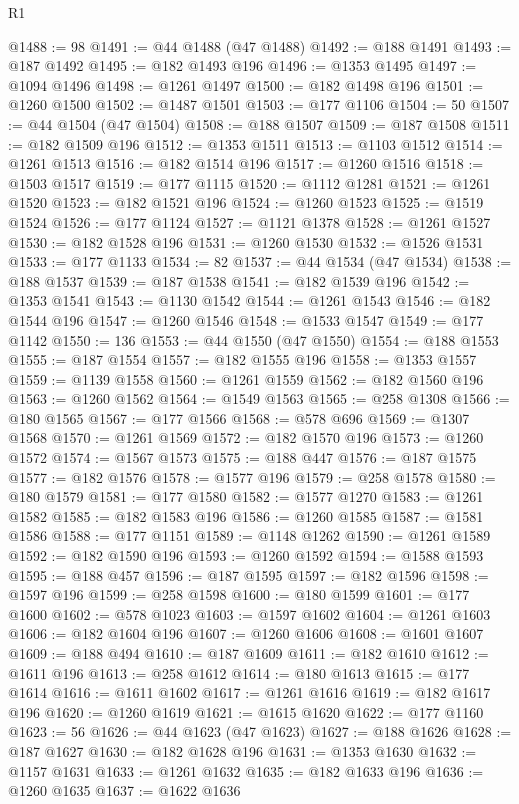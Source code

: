 \begin{lexlean}{R1}
\begin{coremodule}
@1488 := 98
@1491 := @44 @1488 (@47 @1488)
@1492 := @188 @1491
@1493 := @187 @1492
@1495 := @182 @1493 @196
@1496 := @1353 @1495
@1497 := @1094 @1496
@1498 := @1261 @1497
@1500 := @182 @1498 @196
@1501 := @1260 @1500
@1502 := @1487 @1501
@1503 := @177 @1106
@1504 := 50
@1507 := @44 @1504 (@47 @1504)
@1508 := @188 @1507
@1509 := @187 @1508
@1511 := @182 @1509 @196
@1512 := @1353 @1511
@1513 := @1103 @1512
@1514 := @1261 @1513
@1516 := @182 @1514 @196
@1517 := @1260 @1516
@1518 := @1503 @1517
@1519 := @177 @1115
@1520 := @1112 @1281
@1521 := @1261 @1520
@1523 := @182 @1521 @196
@1524 := @1260 @1523
@1525 := @1519 @1524
@1526 := @177 @1124
@1527 := @1121 @1378
@1528 := @1261 @1527
@1530 := @182 @1528 @196
@1531 := @1260 @1530
@1532 := @1526 @1531
@1533 := @177 @1133
@1534 := 82
@1537 := @44 @1534 (@47 @1534)
@1538 := @188 @1537
@1539 := @187 @1538
@1541 := @182 @1539 @196
@1542 := @1353 @1541
@1543 := @1130 @1542
@1544 := @1261 @1543
@1546 := @182 @1544 @196
@1547 := @1260 @1546
@1548 := @1533 @1547
@1549 := @177 @1142
@1550 := 136
@1553 := @44 @1550 (@47 @1550)
@1554 := @188 @1553
@1555 := @187 @1554
@1557 := @182 @1555 @196
@1558 := @1353 @1557
@1559 := @1139 @1558
@1560 := @1261 @1559
@1562 := @182 @1560 @196
@1563 := @1260 @1562
@1564 := @1549 @1563
@1565 := @258 @1308
@1566 := @180 @1565
@1567 := @177 @1566
@1568 := @578 @696
@1569 := @1307 @1568
@1570 := @1261 @1569
@1572 := @182 @1570 @196
@1573 := @1260 @1572
@1574 := @1567 @1573
@1575 := @188 @447
@1576 := @187 @1575
@1577 := @182 @1576
@1578 := @1577 @196
@1579 := @258 @1578
@1580 := @180 @1579
@1581 := @177 @1580
@1582 := @1577 @1270
@1583 := @1261 @1582
@1585 := @182 @1583 @196
@1586 := @1260 @1585
@1587 := @1581 @1586
@1588 := @177 @1151
@1589 := @1148 @1262
@1590 := @1261 @1589
@1592 := @182 @1590 @196
@1593 := @1260 @1592
@1594 := @1588 @1593
@1595 := @188 @457
@1596 := @187 @1595
@1597 := @182 @1596
@1598 := @1597 @196
@1599 := @258 @1598
@1600 := @180 @1599
@1601 := @177 @1600
@1602 := @578 @1023
@1603 := @1597 @1602
@1604 := @1261 @1603
@1606 := @182 @1604 @196
@1607 := @1260 @1606
@1608 := @1601 @1607
@1609 := @188 @494
@1610 := @187 @1609
@1611 := @182 @1610
@1612 := @1611 @196
@1613 := @258 @1612
@1614 := @180 @1613
@1615 := @177 @1614
@1616 := @1611 @1602
@1617 := @1261 @1616
@1619 := @182 @1617 @196
@1620 := @1260 @1619
@1621 := @1615 @1620
@1622 := @177 @1160
@1623 := 56
@1626 := @44 @1623 (@47 @1623)
@1627 := @188 @1626
@1628 := @187 @1627
@1630 := @182 @1628 @196
@1631 := @1353 @1630
@1632 := @1157 @1631
@1633 := @1261 @1632
@1635 := @182 @1633 @196
@1636 := @1260 @1635
@1637 := @1622 @1636

\end{coremodule}
\end{lexlean}
